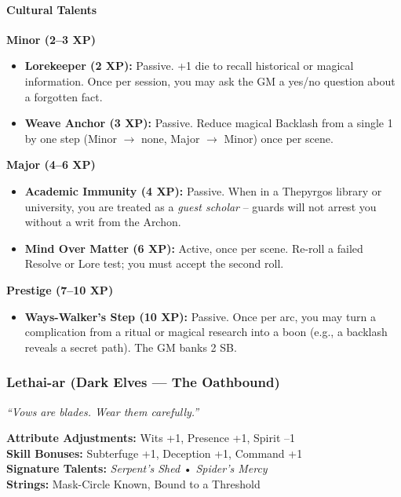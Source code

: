 \paragraph{Cultural Talents}

\textbf{Minor (2--3 XP)}
\begin{itemize}
  \item \textbf{Lorekeeper (2 XP):} Passive. +1 die to recall historical or magical information. Once per session, you may ask the GM a yes/no question about a forgotten fact.
  \item \textbf{Weave Anchor (3 XP):} Passive. Reduce magical Backlash from a single 1 by one step (Minor $\rightarrow$ none, Major $\rightarrow$ Minor) once per scene.
\end{itemize}

\textbf{Major (4--6 XP)}
\begin{itemize}
  \item \textbf{Academic Immunity (4 XP):} Passive. When in a Thepyrgos library or university, you are treated as a \emph{guest scholar} -- guards will not arrest you without a writ from the Archon.
  \item \textbf{Mind Over Matter (6 XP):} Active, once per scene. Re-roll a failed Resolve or Lore test; you must accept the second roll.
\end{itemize}

\textbf{Prestige (7--10 XP)}
\begin{itemize}
  \item \textbf{Ways-Walker's Step (10 XP):} Passive. Once per arc, you may turn a complication from a ritual or magical research into a boon (e.g., a backlash reveals a secret path). The GM banks 2 SB.
\end{itemize}

\subsubsection{Lethai-ar (Dark Elves --- The Oathbound)}
\label{subsec:lethai-ar-detailed}

\emph{``Vows are blades. Wear them carefully.''}

\begin{tcolorbox}[colback=black!3!white,colframe=black!40!white,title=Dark Elf at a Glance,breakable]
\textbf{Attribute Adjustments:} Wits +1, Presence +1, Spirit --1 \\
\textbf{Skill Bonuses:} Subterfuge +1, Deception +1, Command +1 \\
\textbf{Signature Talents:} \emph{Serpent's Shed} • \emph{Spider's Mercy} \\
\textbf{Strings:} Mask-Circle Known, Bound to a Threshold
\end{tcolorbox}

